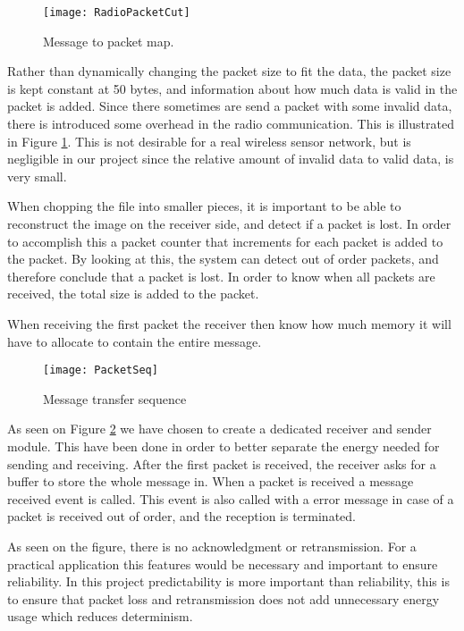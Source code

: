 \begin{figure}[H]
	\centering
	\texttt{[image: RadioPacketCut]}
	\caption{Message to packet map.}
	\label{fig:RadioPacketCut}
\end{figure}

Rather than dynamically changing the packet size to fit the data, the packet size is kept constant at  50 bytes, and information about how much data is valid in the packet is added. 
Since there sometimes are send a packet with some invalid data, there is introduced some overhead in the radio communication. 
This is illustrated in Figure \ref{fig:RadioPacketCut}. 
This is not desirable for a real wireless sensor network, but is negligible in our project since the relative amount of invalid data to valid data, is very small.

When chopping the file into smaller pieces, it is important to be able to reconstruct the image on the receiver side, and detect if a packet is lost. 
In order to accomplish this a packet counter that increments for each packet is added to the packet. 
By looking at this, the system can detect out of order packets, and therefore conclude that a packet is lost. 
In order to know when all packets are received, the total size is added to the packet.

When receiving the first packet the receiver then know how much memory it will have to allocate to contain the entire message. 


\begin{figure}[H]
	\centering
	\texttt{[image: PacketSeq]}
	\caption{Message transfer sequence }
	\label{fig:PacketSeq}
\end{figure}

As seen on Figure \ref{fig:PacketSeq} we have chosen to create a dedicated receiver and sender module. 
This have been done in order to better separate the energy needed for sending and receiving. 
After the first packet is received, the receiver asks for a buffer to store the whole message in. 
When a packet is received a message received event is called. 
This event is also called with a error message in case of a packet is received out of order, and the reception is terminated. 

As seen on the figure, there is no acknowledgment or retransmission. 
For a practical application this features would be necessary and important to ensure reliability.
In this project predictability is more important than reliability, this is to ensure that packet loss and retransmission does not add unnecessary energy usage which reduces determinism.


